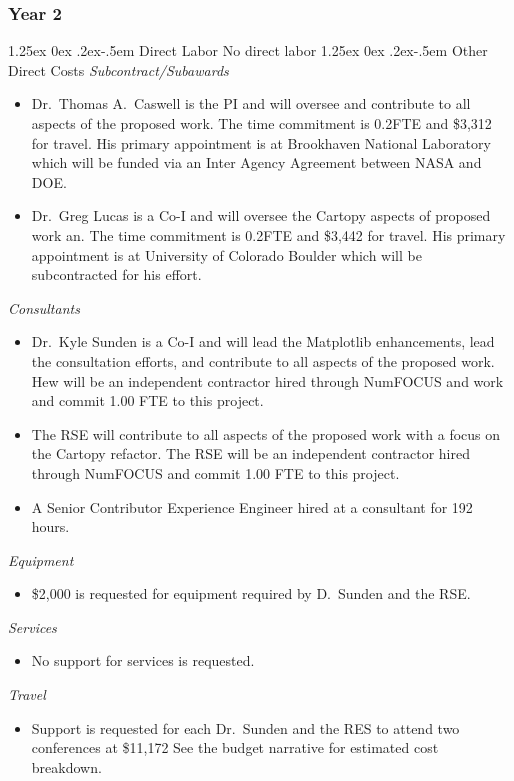 \documentclass[12pt]{article}
\makeatletter
\numberwithin{page}{section}
\renewcommand{\paragraph}{%
  \@startsection{paragraph}{4}%
  {\z@}{1.25ex \@plus 0ex \@minus .2ex}{-.5em}%
  {\normalfont\normalsize\itshape\bfseries}%
}
\makeatother
\begin{document}
\subsubsection{Year 2}
\paragraph{Direct Labor}
No direct labor
\paragraph{Other Direct Costs}
\textit{Subcontract/Subawards}
\begin{itemize}
  \item Dr.\ Thomas A.\ Caswell is the PI and will oversee and contribute to
    all aspects of the proposed work.  The time commitment is 0.2FTE and \$3,312
    for travel.  His primary appointment is at Brookhaven National Laboratory
    which will be funded via an Inter Agency Agreement between NASA and DOE.
  \item Dr.\ Greg Lucas is a Co-I and will oversee the Cartopy aspects of
    proposed work an.  The time commitment is 0.2FTE and \$3,442 for travel.
    His primary appointment is at University of Colorado Boulder which will be
    subcontracted for his effort.
\end{itemize}
\textit{Consultants}
\begin{itemize}
  \item Dr.\ Kyle Sunden is a Co-I and will lead the Matplotlib enhancements,
    lead the consultation efforts, and contribute to all aspects of the
    proposed work.  Hew will be an independent contractor hired through NumFOCUS and work and commit
    1.00 FTE to this project.
  \item The RSE will contribute to all aspects of the proposed work with a
    focus on the Cartopy refactor.  The RSE will be an independent contractor hired
    through NumFOCUS and commit 1.00 FTE to this project.
  \item A Senior Contributor Experience Engineer hired at a consultant for 192 hours.

\end{itemize}
\textit{Equipment}
\begin{itemize}
\item \$2,000 is requested for equipment required by D.\ Sunden and the RSE.
\end{itemize}
\textit{Services}
\begin{itemize}
\item No support for services is requested.
\end{itemize}
\textit{Travel}
\begin{itemize}
\item Support is requested for each Dr.\ Sunden and the RES to attend two conferences at
  \$11,172  See the budget narrative for estimated cost  breakdown.
\end{itemize}
\end{document}
